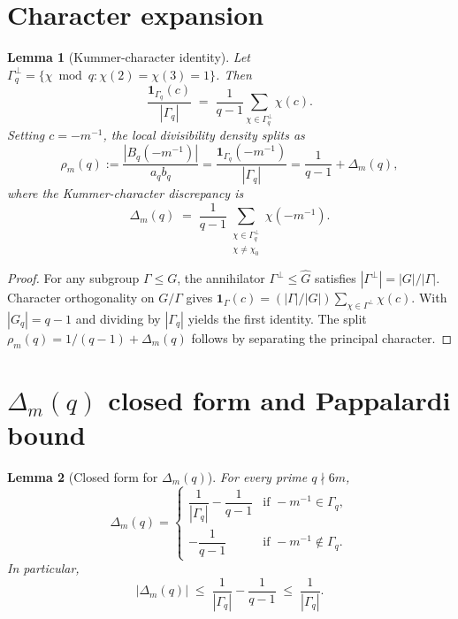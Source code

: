 \documentclass[12pt]{amsart}
\newtheorem{lemma}{Lemma}
\theoremstyle{definition}
\theoremstyle{remark}
\begin{document}
\section{Character expansion}

\begin{lemma}[Kummer-character identity]\label{lem:R684}
Let $\Gamma_q^\perp = \{\chi \bmod q : \chi(2) = \chi(3) = 1\}$. Then
$$
\frac{\mathbf{1}_{\Gamma_q}(c)}{|\Gamma_q|}
\;=\;
\frac{1}{q - 1}
\sum_{\chi \in \Gamma_q^\perp}
\chi(c).
$$
Setting $c = -m^{-1}$, the local divisibility density splits as
$$
\rho_m(q) := \frac{|B_q(-m^{-1})|}{a_q b_q}
= \frac{\mathbf{1}_{\Gamma_q}(-m^{-1})}{|\Gamma_q|}
= \frac{1}{q-1}
+ \Delta_m(q),
$$
where the Kummer-character discrepancy is
$$
\Delta_m(q)
\;=\;
\frac{1}{q-1}
\sum_{\substack{\chi \in \Gamma_q^\perp \\ \chi \ne \chi_0}}
\chi(-m^{-1}).
$$
\end{lemma}

\begin{proof}
For any subgroup $\Gamma \le G$, the annihilator $\Gamma^\perp \le \widehat{G}$ satisfies
$|\Gamma^\perp| = |G|/|\Gamma|$. Character orthogonality on $G/\Gamma$ gives
$\mathbf{1}_\Gamma(c) = (|\Gamma|/|G|) \sum_{\chi \in \Gamma^\perp} \chi(c)$.
With $|G_q| = q - 1$ and dividing by $|\Gamma_q|$ yields the first identity.
The split $\rho_m(q) = 1/(q-1) + \Delta_m(q)$ follows by separating the principal character.
\end{proof}

\section{$\Delta_m(q)$ closed form and Pappalardi bound}

\begin{lemma}[Closed form for $\Delta_m(q)$]\label{lem:Delta-closed}
For every prime $q \nmid 6m$,
$$
\Delta_m(q)
=
\begin{cases}
\dfrac{1}{|\Gamma_q|} - \dfrac{1}{q-1}
& \text{if } -m^{-1} \in \Gamma_q,
\\[1.2em]
-\dfrac{1}{q-1}
& \text{if } -m^{-1} \notin \Gamma_q.
\end{cases}
$$
In particular,
$$
|\Delta_m(q)|
\;\le\;
\frac{1}{|\Gamma_q|} - \frac{1}{q-1}
\;\le\;
\frac{1}{|\Gamma_q|}.
$$
\end{lemma}
\end{document}
